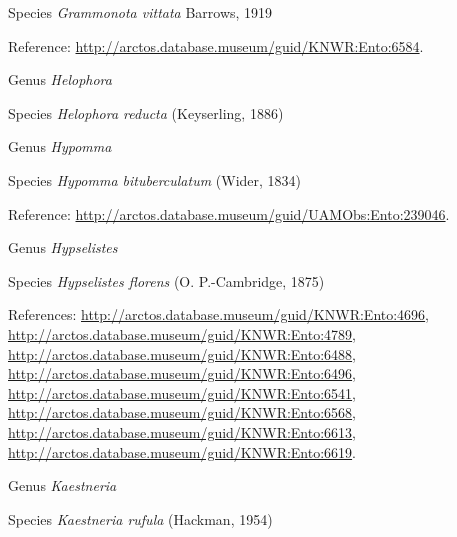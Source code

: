 \documentclass[9pt, article]{memoir}
\begin{document}
\begin{multicols}{2}
\vspace{6pt}\noindent\hspace{36pt}Species \textit{Grammonota vittata} Barrows, 1919


\vspace{6pt}Reference: 
\url{http://arctos.database.museum/guid/KNWR:Ento:6584}.

\vspace{6pt}\noindent\hspace{30pt}Genus \textit{Helophora}


\vspace{6pt}\noindent\hspace{36pt}Species \textit{Helophora reducta} (Keyserling, 1886)


\vspace{6pt}\noindent\hspace{30pt}Genus \textit{Hypomma}


\vspace{6pt}\noindent\hspace{36pt}Species \textit{Hypomma bituberculatum} (Wider, 1834)


\vspace{6pt}Reference: 
\url{http://arctos.database.museum/guid/UAMObs:Ento:239046}.

\vspace{6pt}\noindent\hspace{30pt}Genus \textit{Hypselistes}


\vspace{6pt}\noindent\hspace{36pt}Species \textit{Hypselistes florens} (O. P.-Cambridge, 1875)


\vspace{6pt}References: 
\url{http://arctos.database.museum/guid/KNWR:Ento:4696}, 
\url{http://arctos.database.museum/guid/KNWR:Ento:4789}, 
\url{http://arctos.database.museum/guid/KNWR:Ento:6488}, 
\url{http://arctos.database.museum/guid/KNWR:Ento:6496}, 
\url{http://arctos.database.museum/guid/KNWR:Ento:6541}, 
\url{http://arctos.database.museum/guid/KNWR:Ento:6568}, 
\url{http://arctos.database.museum/guid/KNWR:Ento:6613}, 
\url{http://arctos.database.museum/guid/KNWR:Ento:6619}.

\vspace{6pt}\noindent\hspace{30pt}Genus \textit{Kaestneria}


\vspace{6pt}\noindent\hspace{36pt}Species \textit{Kaestneria rufula} (Hackman, 1954)



\end{multicols}
\end{document}
